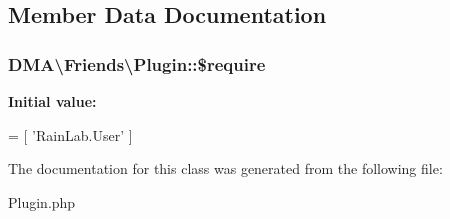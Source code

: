 \subsection{Member Data Documentation}
\hypertarget{classDMA_1_1Friends_1_1Plugin_a3c98aaa659a7b26aaef32d2767f14738}{}
\subsubsection[{\$require}]{\setlength{\rightskip}{0pt plus 5cm}D\+M\+A\textbackslash{}\+Friends\textbackslash{}\+Plugin\+::\$require}\label{classDMA_1_1Friends_1_1Plugin_a3c98aaa659a7b26aaef32d2767f14738}
{\bfseries Initial value\+:}
\begin{DoxyCode}
= [
        \textcolor{stringliteral}{'RainLab.User'}
    ]
\end{DoxyCode}


The documentation for this class was generated from the following file\+:\begin{DoxyCompactItemize}
\item 
Plugin.\+php\end{DoxyCompactItemize}
